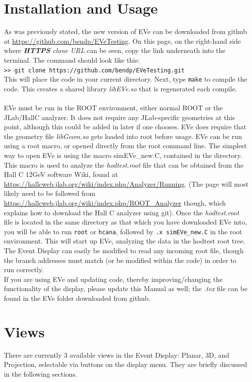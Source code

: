 \documentclass[12pt]{article}
\numberwithin{equation}{section}
\begin{document}
\section{Installation and Usage}
As was previously stated, the new version of EVe can be downloaded from github at \url{https://github.com/bendp/EVeTesting}. On this page, on the right-hand side where \textit{\textbf{HTTPS} clone URL} can be seen, copy the link underneath into the terminal. The command should look like this:
\\
\texttt{>> git clone https://github.com/bendp/EVeTesting.git }
\\
This will place the code in your current directory. Next, type \texttt{make} to compile the code. This creates a shared library \textit{libEVe.so} that is regenerated each compile. 
\\
\\
EVe must be run in the ROOT environment, either normal ROOT or the JLab/HallC analyzer. It does not require any JLab-specific geometries at this point, although this could be added in later if one chooses. EVe does require that the geometry file \textit{libGeom.so} gets loaded into root before usage. EVe can be run using a root macro, or opened directly from the root command line. The simplest way to open EVe is using the macro simEVe\_new.C, contained in the directory. This macro is used to analyze the \textit{hodtest.root} file that can be obtained from the Hall C 12GeV software Wiki, found at \url{https://hallcweb.jlab.org/wiki/index.php/Analyzer/Running}. (The page will most likely need to be followed from \url{https://hallcweb.jlab.org/wiki/index.php/ROOT_Analyzer} though, which explains how to download the Hall C analyzer using git). Once the \textit{hodtest.root} file is located in the same directory as that which you have downloaded EVe into, you will be able to run \texttt{root} or \texttt{hcana}, followed by \texttt{.x simEVe\_new.C} in the root environment. This will start up EVe, analyzing the data in the hodtest root tree. The Event Display can easily be modified to read any incoming root file, though the branch addresses must match (or be modified within the code) in order to run correctly.
\\
If you are using EVe and updating code, thereby improving/changing the functionality of the display, please update this Manual as well; the \textit{.tex} file can be found in the EVe folder downloaded from github.

\section{Views}
There are currently 3 available views in the Event Display: Planar, 3D, and Projection, selectable via buttons on the display menu. They are briefly discussed in the following sections.
\end{document}

